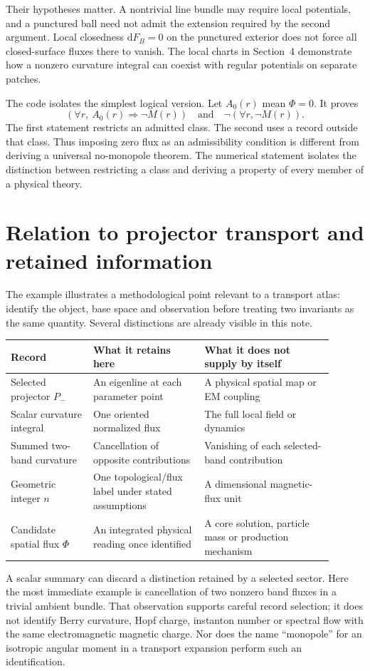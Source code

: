 \documentclass[11pt]{article}
\theoremstyle{definition}\newtheorem{definition}[theorem]{Definition}
\theoremstyle{remark}\newtheorem{remark}[theorem]{Remark}
\newcommand{\dd}{\mathrm{d}}
\begin{document}
Their hypotheses matter. A nontrivial line bundle may require local potentials, and a punctured ball need not admit the extension required by the second argument. Local closedness $\dd F_B=0$ on the punctured exterior does not force all closed-surface fluxes there to vanish. The local charts in Section~4 demonstrate how a nonzero curvature integral can coexist with regular potentials on separate patches.

The code isolates the simplest logical version. Let $A_0(r)$ mean $\Phi=0$. It proves
\hypertarget{eq:admiss}{}
\begin{equation}
 (\forall r,\ A_0(r)\Rightarrow\neg M(r))
 \quad\text{and}\quad
 \neg(\forall r,\neg M(r)).
\end{equation}
The first statement restricts an admitted class. The second uses a record outside that class. Thus imposing zero flux as an admissibility condition is different from deriving a universal no-monopole theorem. The numerical statement isolates the distinction between restricting a class and deriving a property of every member of a physical theory.

\section{Relation to projector transport and retained information}
The example illustrates a methodological point relevant to a transport atlas: identify the object, base space and observation before treating two invariants as the same quantity. Several distinctions are already visible in this note.

\begin{center}\small
\begin{tabular}{p{0.23\linewidth}p{0.31\linewidth}p{0.36\linewidth}}
\toprule
Record & What it retains here & What it does not supply by itself\\\midrule
Selected projector $P_-$ & An eigenline at each parameter point & A physical spatial map or EM coupling\\
Scalar curvature integral & One oriented normalized flux & The full local field or dynamics\\
Summed two-band curvature & Cancellation of opposite contributions & Vanishing of each selected-band contribution\\
Geometric integer $n$ & One topological/flux label under stated assumptions & A dimensional magnetic-flux unit\\
Candidate spatial flux $\Phi$ & An integrated physical reading once identified & A core solution, particle mass or production mechanism\\\bottomrule
\end{tabular}
\end{center}
A scalar summary can discard a distinction retained by a selected sector. Here the most immediate example is cancellation of two nonzero band fluxes in a trivial ambient bundle. That observation supports careful record selection; it does not identify Berry curvature, Hopf charge, instanton number or spectral flow with the same electromagnetic magnetic charge. Nor does the name ``monopole'' for an isotropic angular moment in a transport expansion perform such an identification.
\end{document}
